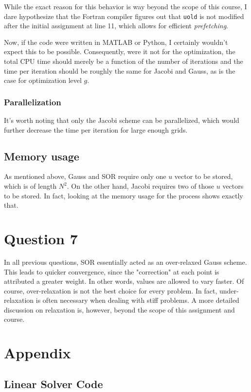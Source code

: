 \documentclass{SelimArticle}
\begin{document}
While the exact reason for this behavior is way beyond the scope of this course, I dare hypothesize
that the Fortran compiler figures out that \texttt{uold} is not modified after the initial
assignment at line 11, which allows for efficient \textit{prefetching}.

Now, if the code were written in MATLAB or Python, I certainly wouldn't expect this to be possible.
Consequently, were it not for the optimization, the total CPU time should merely be a function of
the number of iterations and the time per iteration should be roughly the same for Jacobi and Gauss,
as is the case for optimization level $g$.

\subsubsection{Parallelization}
It's worth noting that only the Jacobi scheme can be parallelized, which would further decrease
the time per iteration for large enough grids.

\subsection{Memory usage}
As mentioned above, Gauss and SOR require only one $u$ vector to be stored, which is of length $N^2$. On
the other hand, Jacobi requires two of those $u$ vectors to be stored. In fact, looking at the memory usage
for the process shows exactly that.

\section{Question 7}
In all previous questions, SOR essentially acted as an over-relaxed Gauss scheme. This leads to quicker
convergence, since the "correction" at each point is attributed a greater weight.
In other words, values are allowed to vary faster. Of course, over-relaxation is not the
best choice for every problem. In fact, under-relaxation is often necessary when dealing with stiff
problems. A more detailed discussion on relaxation is, however, beyond the scope of this assignment and course.

\newpage
\appendix
\section{Appendix}
\subsection{Linear Solver Code}

\end{document}
